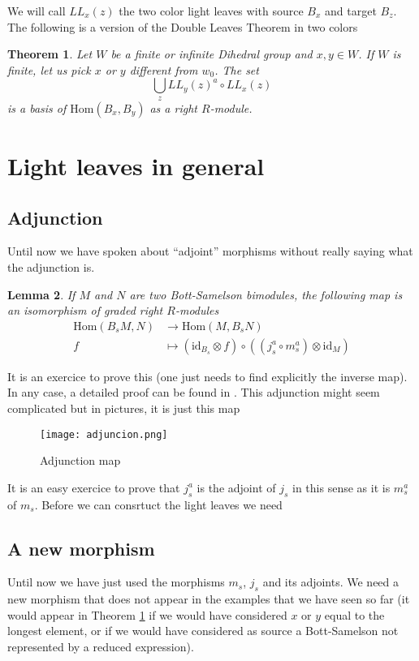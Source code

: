 \documentclass[12pt]{wart}
\newtheorem{thm}{Theorem}[section]
\newtheorem{lem}[thm]{Lemma}
\theoremstyle{remark}
\begin{document}
We will call $LL_{x}(z)$ the two color light leaves with source $B_x$ and target $B_z$. The following is a version of the Double Leaves Theorem in two colors 

\begin{thm}\label{DL}
Let $W$ be a finite or infinite Dihedral group and $x,y\in W$. If $W$ is finite, let us pick $x$ or $y$ different from $w_0$.
The set $$\bigcup_{z} LL_y(z)^a\circ LL_x(z)$$ is a basis of $\mathrm{Hom}(B_x,B_y)$ as a right $R$-module. 
\end{thm}


\section{Light leaves in general}\label{Light leaves basis}

\subsection{Adjunction}\label{adjunction}
Until now we have spoken about ``adjoint'' morphisms without really saying what the adjunction is. 

\begin{lem}
If $M$ and $N$ are two Bott-Samelson bimodules, the following map is an isomorphism of graded right $R$-modules 
\begin{align*}
\mathrm{Hom}(B_sM,N)&\rightarrow \mathrm{Hom}(M,B_sN)\\
f&\mapsto (\mathrm{id}_{B_s}\otimes f)\circ ((j_s^a\circ m_s^a)\otimes \mathrm{id}_M)
\end{align*}
\end{lem}

It is an exercice to prove this (one just needs to find explicitly the inverse map). 
 In any case, a detailed proof can be found in \cite[Lemme 2.4]{Li0}. This adjunction might seem complicated but in pictures, it is just this map
\begin{figure}[H] \begin{center}
 \texttt{[image: adjuncion.png]} 
\caption{Adjunction map}  
\end{center}
\end{figure} 
It is an easy exercice to prove that $j_s^a$ is the adjoint of $j_s$ in this sense as it is $m_s^a$ of $m_s$. 
Before we can consrtuct the light leaves we need 

\subsection{A new morphism} Until now we have  just used the morphisms $m_s$, $j_s$ and its adjoints. We need a new morphism that does not appear in the examples that we have seen so far (it would appear in Theorem \ref{DL} if we would have considered $x$ or $y$ equal to the longest element, or if we would have considered as source a Bott-Samelson not represented by a reduced expression). 
\end{document}
